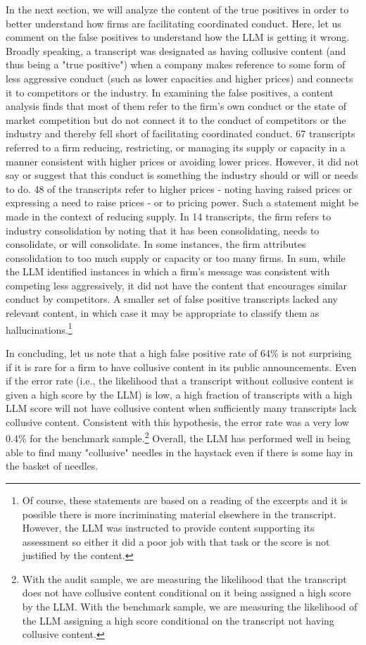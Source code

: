 In the next section, we will analyze the content of the true positives in order to 
better understand how firms are facilitating coordinated conduct. Here, let 
us comment on the false positives to understand how the LLM is getting it 
wrong. Broadly speaking, a transcript was designated as having collusive 
content (and thus being a "true positive") when a company makes reference 
to some form of less aggressive conduct (such as lower capacities and 
higher prices) and connects it to competitors or the industry. In examining 
the  false positives, a content analysis finds that most of them refer 
to the firm's own conduct or the state of market competition but do 
not connect it to the conduct of competitors or the industry and thereby 
fell short of facilitating coordinated conduct. 67 transcripts
referred to a firm reducing, restricting, or managing its supply or capacity
in a manner consistent with higher prices or avoiding lower prices. However,
it did not say or suggest that this conduct is something the industry should
or will or needs to do. 48 of the transcripts refer to higher prices - noting having raised prices or expressing a need to raise prices - or to
pricing power. Such a statement might be made in the context of reducing
supply. In 14 transcripts, the firm refers to industry consolidation by
noting that it has been consolidating, needs to consolidate, or will consolidate.
In some instances, the firm attributes consolidation to too much supply
or capacity or too many firms. In sum, while the LLM identified instances 
in which a firm's message was consistent with competing less aggressively,
it did not have the content that encourages similar conduct by 
competitors. A smaller set of false positive transcripts lacked any
relevant content, in which
case it may be appropriate to classify them as hallucinations.\footnote{%
Of course, these statements are based on a reading of the excerpts and it is
possible there is more incriminating material elsewhere in the transcript.
However, the LLM was instructed to provide content supporting its
assessment so either it did a poor job with that task or the score is not
justified by the content.}

In concluding, let us note that a high false positive rate of 64\% is not 
surprising if it 
is rare for a firm to have collusive content in its public announcements. 
Even if the error rate (i.e., the likelihood that a transcript without 
collusive content is given a high score by the LLM) is low, a high fraction 
of transcripts with a high LLM score will not have collusive content when 
sufficiently many transcripts lack collusive content. Consistent with this 
hypothesis, the error rate was a very low 0.4\% for the benchmark sample.\footnote{With the audit sample, we are measuring the likelihood that the 
transcript does not have collusive content conditional on it being assigned 
a high score by the LLM. With the benchmark sample, we are measuring the 
likelihood of the LLM assigning a high score conditional on the transcript 
not having collusive content.} Overall, the LLM has performed well in being
able to find many "collusive" needles in the haystack even if there is some hay
in the basket of needles.
